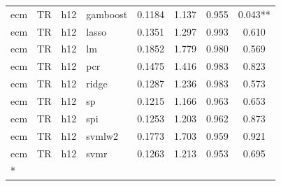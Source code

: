 \begin{ThreePartTable}
\begin{longtable}[t]{llclcccc}
ecm & TR & h12 & gamboost & 0.1184 & 1.137 & 0.955 & 0.043**\\
ecm & TR & h12 & lasso & 0.1351 & 1.297 & 0.993 & 0.610\\
ecm & TR & h12 & lm & 0.1852 & 1.779 & 0.980 & 0.569\\
ecm & TR & h12 & pcr & 0.1475 & 1.416 & 0.983 & 0.823\\
ecm & TR & h12 & ridge & 0.1287 & 1.236 & 0.983 & 0.573\\
ecm & TR & h12 & sp & 0.1215 & 1.166 & 0.963 & 0.653\\
ecm & TR & h12 & spi & 0.1253 & 1.203 & 0.962 & 0.873\\
ecm & TR & h12 & svmlw2 & 0.1773 & 1.703 & 0.959 & 0.921\\
ecm & TR & h12 & svmr & 0.1263 & 1.213 & 0.953 & 0.695\\*
\end{longtable}
\end{ThreePartTable}
\endgroup{}
